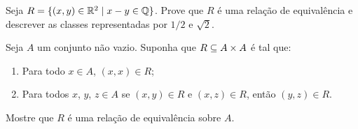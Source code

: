\documentclass[12pt]{exam}
\begin{document}
    \vspace{.3cm}

    \questao{} Seja $R = \{ (x, y) \in \mathbb{R}^2 \mid x - y \in \mathbb{Q}\}$. Prove que $R$ {\'e} uma rela{\c c}{\~a}o de equival{\^e}ncia e descrever as classes representadas por $1/2$ e $\sqrt{2}$.

    \vspace{.3cm}

    \questao{} Seja $A$ um conjunto n\~ao vazio. Suponha que $R \subseteq A \times A$ \'e tal que:
    \begin{enumerate}[label={\alph*})]
        \item Para todo $x \in A$, $(x,x) \in R$;
        \item Para todos $x$, $y$, $z \in A$ se $(x, y) \in R$ e $(x,z) \in R$, ent\~ao $(y,z) \in R$.
    \end{enumerate}
    Mostre que $R$ \'e uma rela\c{c}\~ao de equival\^encia sobre $A$.
\end{document}
